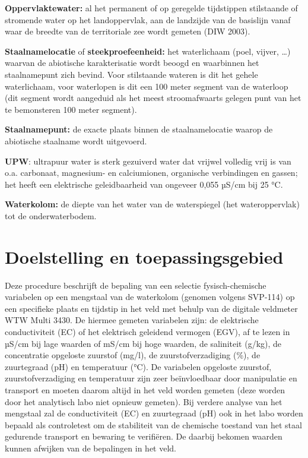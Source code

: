 \documentclass[
]{scrreprt}
\begin{document}
\textbf{Oppervlaktewater:} al het permanent of op geregelde tijdstippen stilstaande of stromende water op het landoppervlak, aan de landzijde van de basislijn vanaf waar de breedte van de territoriale zee wordt gemeten (DIW 2003).

\textbf{Staalnamelocatie} of \textbf{steekproefeenheid:} het waterlichaam (poel, vijver, \ldots) waarvan de abiotische karakterisatie wordt beoogd en waarbinnen het staalnamepunt zich bevind.
Voor stilstaande wateren is dit het gehele waterlichaam, voor waterlopen is dit een 100 meter segment van de waterloop (dit segment wordt aangeduid als het meest stroomafwaarts gelegen punt van het te bemonsteren 100 meter segment).

\textbf{Staalnamepunt:} de exacte plaats binnen de staalnamelocatie waarop de abiotische staalname wordt uitgevoerd.

\textbf{UPW}: ultrapuur water is sterk gezuiverd water dat vrijwel volledig vrij is van o.a.
carbonaat, magnesium- en calciumionen, organische verbindingen en gassen; het heeft een elektrische geleidbaarheid van ongeveer 0,055 µS/cm bij 25 °C.

\textbf{Waterkolom:} de diepte van het water van de waterspiegel (het wateroppervlak) tot de onderwaterbodem.

\hypertarget{doelstelling-en-toepassingsgebied}{%
\section{Doelstelling en toepassingsgebied}\label{doelstelling-en-toepassingsgebied}}

Deze procedure beschrijft de bepaling van een selectie fysisch-chemische variabelen op een mengstaal van de waterkolom (genomen volgens SVP-114) op een specifieke plaats en tijdstip in het veld met behulp van de digitale veldmeter WTW Multi 3430.
De hiermee gemeten variabelen zijn: de elektrische conductiviteit (EC) of het elektrisch geleidend vermogen (EGV), af te lezen in µS/cm bij lage waarden of mS/cm bij hoge waarden, de saliniteit (g/kg), de concentratie opgeloste zuurstof (mg/l), de zuurstofverzadiging (\%), de zuurtegraad (pH) en temperatuur (°C).
De variabelen opgeloste zuurstof, zuurstofverzadiging en temperatuur zijn zeer beïnvloedbaar door manipulatie en transport en moeten daarom altijd in het veld worden gemeten (deze worden door het analytisch labo niet opnieuw gemeten).
Bij verdere analyse van het mengstaal zal de conductiviteit (EC) en zuurtegraad (pH) ook in het labo worden bepaald als controletest om de stabiliteit van de chemische toestand van het staal gedurende transport en bewaring te verifiëren.
De daarbij bekomen waarden kunnen afwijken van de bepalingen in het veld.
\end{document}
